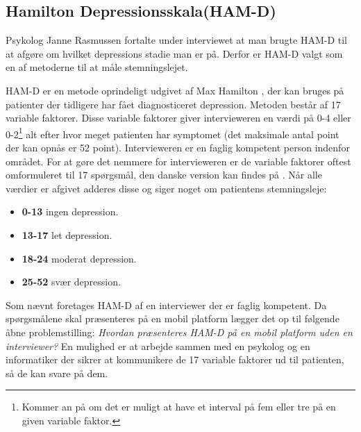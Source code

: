 \subsection{Hamilton Depressionsskala(HAM-D)}
Psykolog Janne Rasmussen fortalte under interviewet at man brugte HAM-D til at afgøre om hvilket depressions stadie man er på.\cite[Afsnit 1.3, Møde med Psykolog Janne Rasmussen]{faelles}
Derfor er HAM-D valgt som en af metoderne til at måle stemningslejet.

HAM-D er en metode oprindeligt udgivet af Max Hamilton \cite{ham_d}, der kan bruges på patienter der tidligere har fået diagnosticeret depression. 
Metoden består af 17 variable faktorer.
Disse variable faktorer giver intervieweren en værdi på 0-4 eller 0-2\footnote{Kommer an på om det er muligt at have et interval på fem eller tre på en given variable faktor.} alt efter hvor meget patienten har symptomet (det maksimale antal point der kan opnås er 52 point).
Intervieweren er en faglig kompetent person indenfor området.
For at gøre det nemmere for intervieweren er de variable faktorer oftest omformuleret til 17 spørgsmål, den danske version kan findes på \citet{ham_d_dansk}.
Når alle værdier er afgivet adderes disse og siger noget om patientens stemningsleje:
\begin{itemize}
	\item \textbf{0-13} ingen depression.
	\item \textbf{13-17} let depression.
	\item \textbf{18-24} moderat depression.
	\item \textbf{25-52} svær depression.
\end{itemize}

Som nævnt foretages HAM-D af en interviewer der er faglig kompetent.
Da spørgsmålene skal præsenteres på en mobil platform lægger det op til følgende åbne problemstilling: \textit{Hvordan præsenteres HAM-D på en mobil platform uden en interviewer?}
En mulighed er at arbejde sammen med en psykolog og en informatiker der sikrer at kommunikere de 17 variable faktorer ud til patienten, så de kan svare på dem.